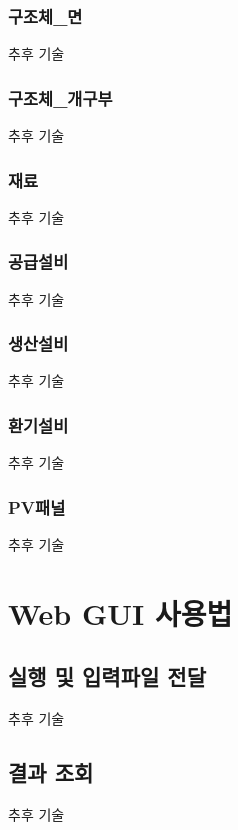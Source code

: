 \subsection{구조체\_면}
추후 기술

\subsection{구조체\_개구부}
추후 기술

\subsection{재료}
추후 기술

\subsection{공급설비}
추후 기술

\subsection{생산설비}
추후 기술

\subsection{환기설비}
추후 기술

\subsection{PV패널}
추후 기술

\chapter{Web GUI 사용법}

\section{실행 및 입력파일 전달}
추후 기술

\section{결과 조회}
추후 기술